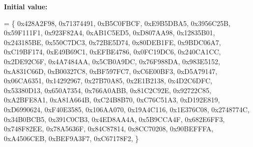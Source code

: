 {\bfseries Initial value\+:}
\begin{DoxyCode}
= \{
        0x428A2F98, 0x71374491, 0xB5C0FBCF, 0xE9B5DBA5,
        0x3956C25B, 0x59F111F1, 0x923F82A4, 0xAB1C5ED5,
        0xD807AA98, 0x12835B01, 0x243185BE, 0x550C7DC3,
        0x72BE5D74, 0x80DEB1FE, 0x9BDC06A7, 0xC19BF174,
        0xE49B69C1, 0xEFBE4786, 0x0FC19DC6, 0x240CA1CC,
        0x2DE92C6F, 0x4A7484AA, 0x5CB0A9DC, 0x76F988DA,
        0x983E5152, 0xA831C66D, 0xB00327C8, 0xBF597FC7,
        0xC6E00BF3, 0xD5A79147, 0x06CA6351, 0x14292967,
        0x27B70A85, 0x2E1B2138, 0x4D2C6DFC, 0x53380D13,
        0x650A7354, 0x766A0ABB, 0x81C2C92E, 0x92722C85,
        0xA2BFE8A1, 0xA81A664B, 0xC24B8B70, 0xC76C51A3,
        0xD192E819, 0xD6990624, 0xF40E3585, 0x106AA070,
        0x19A4C116, 0x1E376C08, 0x2748774C, 0x34B0BCB5,
        0x391C0CB3, 0x4ED8AA4A, 0x5B9CCA4F, 0x682E6FF3,
        0x748F82EE, 0x78A5636F, 0x84C87814, 0x8CC70208,
        0x90BEFFFA, 0xA4506CEB, 0xBEF9A3F7, 0xC67178F2,
\}
\end{DoxyCode}
